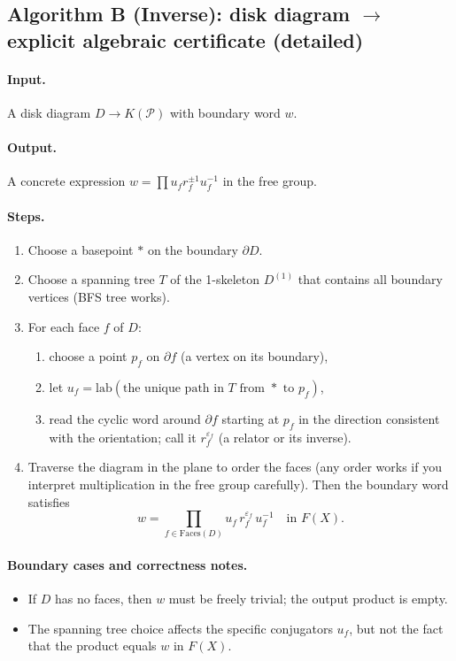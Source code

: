 \documentclass[11pt]{article}
\theoremstyle{definition}
\theoremstyle{plain}
\theoremstyle{remark}
\newcommand{\lab}{\mathrm{lab}}
\newcommand{\Faces}{\mathrm{Faces}}
\begin{document}
\subsection*{Algorithm B (Inverse): disk diagram $\to$ explicit algebraic certificate (detailed)}\cite{vanKampen1933,lyndonschupp1977}
\paragraph{Input.} A disk diagram $D\to K(\mathcal P)$ with boundary word $w$.
\paragraph{Output.} A concrete expression $w=\prod u_f r_f^{\pm1}u_f^{-1}$ in the free group.

\paragraph{Steps.}
\begin{enumerate}[leftmargin=2.2em]
\item Choose a basepoint $*$ on the boundary $\partial D$.
\item Choose a spanning tree $T$ of the 1-skeleton $D^{(1)}$ that contains all boundary vertices (BFS tree works).
\item For each face $f$ of $D$:
\begin{enumerate}[leftmargin=2em]
\item choose a point $p_f$ on $\partial f$ (a vertex on its boundary),
\item let $u_f=\lab(\text{the unique path in }T\text{ from }*\text{ to }p_f)$,
\item read the cyclic word around $\partial f$ starting at $p_f$ in the direction consistent with the orientation; call it $r_f^{\varepsilon_f}$ (a relator or its inverse).
\end{enumerate}
\item Traverse the diagram in the plane to order the faces (any order works if you interpret multiplication in the free group carefully).
Then the boundary word satisfies
\[
w=\prod_{f\in \Faces(D)} u_f\, r_f^{\varepsilon_f}\,u_f^{-1}
\quad\text{in }F(X).
\]
\end{enumerate}



\paragraph{Boundary cases and correctness notes.}
\begin{itemize}[leftmargin=2em]
\item If $D$ has no faces, then $w$ must be freely trivial; the output product is empty.
\item The spanning tree choice affects the specific conjugators $u_f$, but not the fact that the product equals $w$ in $F(X)$.
\end{itemize}
\end{document}
